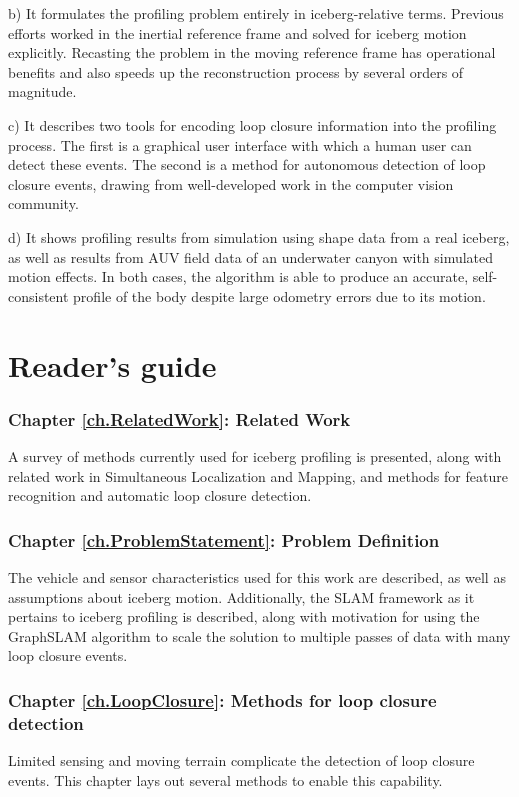 b) It formulates the profiling problem entirely in iceberg-relative terms. Previous efforts worked in the inertial reference frame and solved for iceberg motion explicitly. Recasting the problem in the moving reference frame has operational benefits and also speeds up the reconstruction process by several orders of magnitude. 

c) It describes two tools for encoding loop closure information into the profiling process. The first is a graphical user interface with which a human user can detect these events. The second is a method for autonomous detection of loop closure events, drawing from well-developed work in the computer vision community.

d) It shows profiling results from simulation using shape data from a real iceberg, as well as results from AUV field data of an underwater canyon with simulated motion effects. In both cases, the algorithm is able to produce an accurate, self-consistent profile of the body despite large odometry errors due to its motion.  

\section{Reader's guide}

\subsubsection*{Chapter \ref{ch.RelatedWork}: Related Work} A survey of methods currently used for iceberg profiling is presented, along with related work in Simultaneous Localization and Mapping, and methods for feature recognition and automatic loop closure detection.

\subsubsection*{Chapter \ref{ch.ProblemStatement}: Problem Definition} The vehicle and sensor characteristics used for this work are described, as well as assumptions about iceberg motion. Additionally, the SLAM framework as it pertains to iceberg profiling is described, along with motivation for using the GraphSLAM algorithm to scale the solution to multiple passes of data with many loop closure events.

\subsubsection*{Chapter \ref{ch.LoopClosure}: Methods for loop closure detection} Limited sensing and moving terrain complicate the detection of loop closure events. This chapter lays out several methods to enable this capability.

